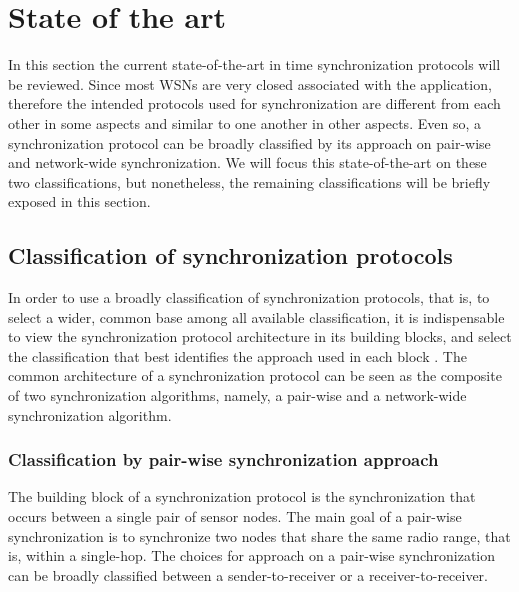 \chapter{State of the art}

In this section the current state-of-the-art in time synchronization protocols will be reviewed. Since most WSNs are very closed associated  with the application, therefore the intended protocols used for synchronization are different from each other in some aspects and similar to one another in other aspects. Even so, a synchronization protocol can be broadly classified by its approach on pair-wise and network-wide synchronization. We will focus this state-of-the-art on these two classifications, but nonetheless, the remaining classifications will be briefly exposed in this section.

\section{Classification of synchronization protocols}
In order to use a broadly classification of synchronization protocols, that is, to select a wider, common base among all available classification, it is indispensable to view the synchronization protocol architecture in its building blocks, and select the classification that best identifies the approach used in each block \cite{1076303}. The common architecture of a synchronization protocol can be seen as the composite of two synchronization algorithms, namely, a pair-wise and a network-wide synchronization algorithm.

\setcounter{secnumdepth}{3}
\subsection{Classification by pair-wise synchronization approach}
The building block of a synchronization protocol is the synchronization that occurs between a single pair of sensor nodes. The main goal of a pair-wise synchronization is to synchronize two nodes that share the same radio range, that is, within a single-hop. The choices for approach on a pair-wise synchronization can be broadly classified between a sender-to-receiver or a receiver-to-receiver.

